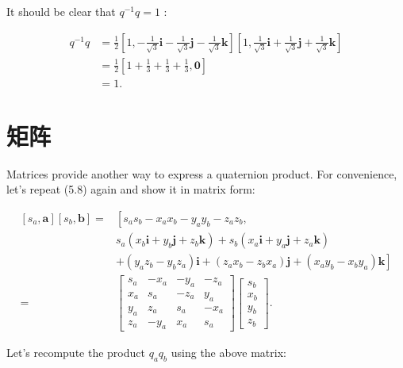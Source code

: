 It should be clear that $q^{-1} q=1$ :

$$
\begin{aligned}
q^{-1} q & =\frac{1}{2}\left[1,-\frac{1}{\sqrt{3}} \mathbf{i}-\frac{1}{\sqrt{3}} \mathbf{j}-\frac{1}{\sqrt{3}} \mathbf{k}\right]\left[1, \frac{1}{\sqrt{3}} \mathbf{i}+\frac{1}{\sqrt{3}} \mathbf{j}+\frac{1}{\sqrt{3}} \mathbf{k}\right] \\
& =\frac{1}{2}\left[1+\frac{1}{3}+\frac{1}{3}+\frac{1}{3}, \mathbf{0}\right] \\
& =1 .
\end{aligned}
$$

\section{矩阵}
Matrices provide another way to express a quaternion product. For convenience, let's repeat (5.8) again and show it in matrix form:

$$
\begin{aligned}
{\left[s_{a}, \mathbf{a}\right]\left[s_{b}, \mathbf{b}\right]=} & {\left[s_{a} s_{b}-x_{a} x_{b}-y_{a} y_{b}-z_{a} z_{b},\right.} \\
& s_{a}\left(x_{b} \mathbf{i}+y_{b} \mathbf{j}+z_{b} \mathbf{k}\right)+s_{b}\left(x_{a} \mathbf{i}+y_{a} \mathbf{j}+z_{a} \mathbf{k}\right) \\
& \left.+\left(y_{a} z_{b}-y_{b} z_{a}\right) \mathbf{i}+\left(z_{a} x_{b}-z_{b} x_{a}\right) \mathbf{j}+\left(x_{a} y_{b}-x_{b} y_{a}\right) \mathbf{k}\right] \\
= & {\left[\begin{array}{cccc}
s_{a} & -x_{a} & -y_{a} & -z_{a} \\
x_{a} & s_{a} & -z_{a} & y_{a} \\
y_{a} & z_{a} & s_{a} & -x_{a} \\
z_{a} & -y_{a} & x_{a} & s_{a}
\end{array}\right]\left[\begin{array}{c}
s_{b} \\
x_{b} \\
y_{b} \\
z_{b}
\end{array}\right] . }
\end{aligned}
$$

Let's recompute the product $q_{a} q_{b}$ using the above matrix:

